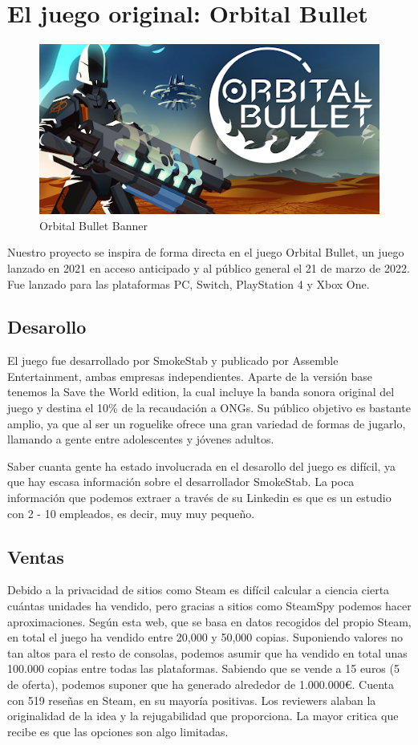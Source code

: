 \documentclass{article}
\begin{document}
\tableofcontents
\newpage

\section{El juego original: Orbital Bullet}
    \begin{figure}[h]
        \centering
        \includegraphics[width=.7\textwidth]{img/1.png}
        \caption[width=.7\textwidth]{Orbital Bullet Banner}
    \end{figure}
    Nuestro proyecto se inspira de forma directa en el juego Orbital Bullet, un juego lanzado en 2021 en acceso anticipado y al público general el 21 de marzo de 2022. 
    Fue lanzado para las plataformas PC, Switch, PlayStation 4 y Xbox One. 

\subsection{Desarollo} 

    El juego fue desarrollado por SmokeStab y publicado por Assemble Entertainment, ambas empresas independientes. 
    Aparte de la versión base tenemos la Save the World edition, la cual incluye la banda sonora original del juego y destina el 10\% de la recaudación a ONGs. 
    Su público objetivo es bastante amplio, ya que al ser un roguelike ofrece una gran variedad de formas de jugarlo, llamando a gente entre adolescentes y jóvenes adultos. 

    Saber cuanta gente ha estado involucrada en el desarollo del juego es difícil, ya que hay escasa información sobre el desarrollador SmokeStab.
    La poca información que podemos extraer a través de su Linkedin es que es un estudio con 2 - 10 empleados, es decir, muy muy pequeño.

\subsection{Ventas}
    Debido a la privacidad de sitios como Steam es difícil calcular a ciencia cierta cuántas unidades ha vendido, pero gracias a sitios como SteamSpy podemos hacer aproximaciones. 
    Según esta web, que se basa en datos recogidos del propio Steam, en total el juego ha vendido entre 20,000 y 50,000 copias. 
    Suponiendo valores no tan altos para el resto de consolas, podemos asumir que ha vendido en total unas 100.000 copias entre todas las plataformas. 
    Sabiendo que se vende a 15 euros (5 de oferta), podemos suponer que ha generado alrededor de 1.000.000€.
    Cuenta con 519 reseñas en Steam, en su mayoría positivas. Los reviewers alaban la originalidad de la idea y la rejugabilidad que proporciona.
    La mayor critica que recibe es que las opciones son algo limitadas. 
\end{document}
